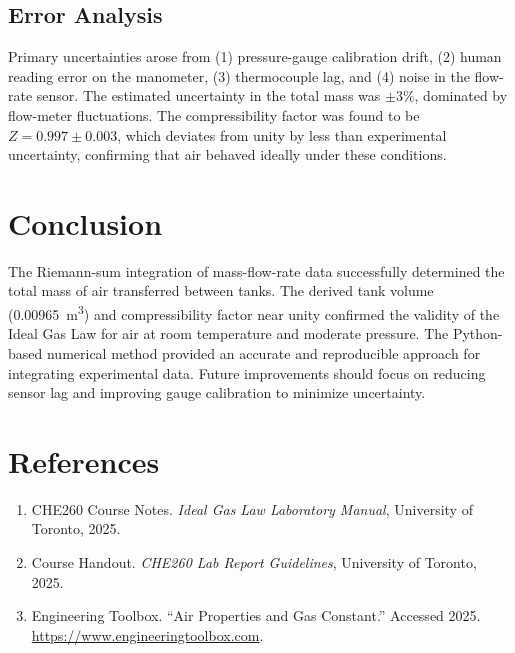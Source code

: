 \documentclass[12pt]{article}
\begin{document}
\subsection*{Error Analysis}
Primary uncertainties arose from (1) pressure-gauge calibration drift, (2) human reading error on the manometer, (3) thermocouple lag, and (4) noise in the flow-rate sensor.  
The estimated uncertainty in the total mass was \(\pm 3\%\), dominated by flow-meter fluctuations.  
The compressibility factor was found to be \(Z = 0.997 \pm 0.003\), which deviates from unity by less than experimental uncertainty, confirming that air behaved ideally under these conditions.

\section*{Conclusion}
The Riemann-sum integration of mass-flow-rate data successfully determined the total mass of air transferred between tanks. The derived tank volume (\SI{0.00965}{\metre\cubed}) and compressibility factor near unity confirmed the validity of the Ideal Gas Law for air at room temperature and moderate pressure. The Python-based numerical method provided an accurate and reproducible approach for integrating experimental data. Future improvements should focus on reducing sensor lag and improving gauge calibration to minimize uncertainty.

\section*{References}
\begin{enumerate}
\item CHE260 Course Notes. \textit{Ideal Gas Law Laboratory Manual}, University of Toronto, 2025.
\item Course Handout. \textit{CHE260 Lab Report Guidelines}, University of Toronto, 2025.
\item Engineering Toolbox. “Air Properties and Gas Constant.” Accessed 2025. \url{https://www.engineeringtoolbox.com}.
\end{enumerate}
\end{document}
